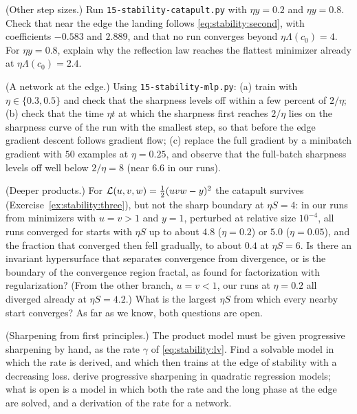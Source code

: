 \begin{refsection}
\begin{exercises}
\item \simulation (Other step sizes.) Run \texttt{15-stability-catapult.py} with $\eta y=0.2$ and $\eta y=0.8$. Check that near the edge the landing follows \eqref{eq:stability:second}, with coefficients $-0.583$ and $2.889$, and that no run converges beyond $\eta\Lambda(c_0)=4$. For $\eta y=0.8$, explain why the reflection law reaches the flattest minimizer already at $\eta\Lambda(c_0)=2.4$.\label{ex:stability:sim1}

\item \simulation (A network at the edge.) Using \texttt{15-stability-mlp.py}: (a) train with $\eta\in\{0.3,0.5\}$ and check that the sharpness levels off within a few percent of $2/\eta$; (b) check that the time $\eta t$ at which the sharpness first reaches $2/\eta$ lies on the sharpness curve of the run with the smallest step, so that before the edge gradient descent follows gradient flow; (c) replace the full gradient by a minibatch gradient with $50$ examples at $\eta=0.25$, and observe that the full-batch sharpness levels off well below $2/\eta=8$ (near $6.6$ in our runs).\label{ex:stability:sim2}

\item \research (Deeper products.) For $\mathcal{L}(u,v,w)=\frac12(uvw-y)^2$ the catapult survives (Exercise~\ref{ex:stability:three}), but not the sharp boundary at $\eta S=4$: in our runs from minimizers with $u=v>1$ and $y=1$, perturbed at relative size $10^{-4}$, all runs converged for starts with $\eta S$ up to about $4.8$ ($\eta=0.2$) or $5.0$ ($\eta=0.05$), and the fraction that converged then fell gradually, to about $0.4$ at $\eta S=6$. Is there an invariant hypersurface that separates convergence from divergence, or is the boundary of the convergence region fractal, as \textcite{LiangMontufar2026} found for factorization with regularization? (From the other branch, $u=v<1$, our runs at $\eta=0.2$ all diverged already at $\eta S=4.2$.) What is the largest $\eta S$ from which every nearby start converges? As far as we know, both questions are open.\label{ex:stability:depth}

\item \research (Sharpening from first principles.) The product model must be given progressive sharpening by hand, as the rate $\gamma$ of \eqref{eq:stability:lv}. Find a solvable model in which the rate is derived, and which then trains at the edge of stability with a decreasing loss. \Textcite{AgarwalaPedregosaPennington2023} derive progressive sharpening in quadratic regression models; what is open is a model in which both the rate and the long phase at the edge are solved, and a derivation of the rate for a network.\label{ex:stability:sharpening}
\end{exercises}



\end{refsection}
